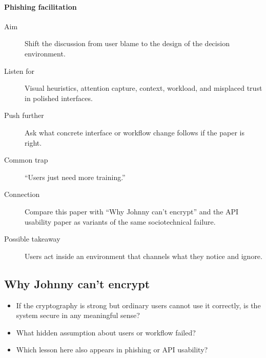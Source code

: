 \paragraph{Phishing facilitation}
\begin{description}
  \item[Aim] Shift the discussion from user blame to the design of the decision
    environment.
  \item[Listen for] Visual heuristics, attention capture, context, workload,
    and misplaced trust in polished interfaces.
  \item[Push further] Ask what concrete interface or workflow change follows if
    the paper is right.
  \item[Common trap] \enquote{Users just need more training.}
  \item[Connection] Compare this paper with \enquote{Why Johnny can't encrypt}
    and the API usability paper as variants of the same sociotechnical failure.
  \item[Possible takeaway] Users act inside an environment that channels what
    they notice and ignore.
\end{description}

\subsection{Why Johnny can't encrypt}

\begin{frame}
  \begin{question}
    \begin{itemize}
      \item If the cryptography is strong but ordinary users cannot use it
        correctly, is the system secure in any meaningful sense?
      \item What hidden assumption about users or workflow failed?
      \item Which lesson here also appears in phishing or API usability?
    \end{itemize}
  \end{question}
\end{frame}

